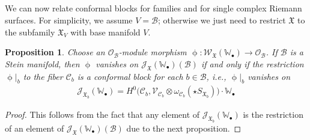 \documentclass[12pt,a4paper,notitlepage]{article}
\theoremstyle{definition}
\theoremstyle{plain}
\newtheorem{pp}[df]{Proposition}
\newcommand{\fk}{\mathfrak}
\newcommand{\mc}{\mathcal}
\newcommand{\scr}{\mathscr}
\newcommand{\SX}{{S_{\fk X}}}
\newcommand{\blt}{\bullet}
\newcommand{\Wbb}{\mathbb W}
\newcommand{\SXb}{{S_{\fk X_b}}}
\numberwithin{equation}{section}
\begin{document}
\subsection{}


We can now relate conformal blocks for families and for single complex Riemann surfaces. For simplicity, we assume $V=\mc B$; otherwise we just need to restrict $\fk X$ to the subfamily $\fk X_V$ with base manifold $V$.

\begin{pp}\label{lb121}
Choose an $\scr O_{\mc B}$-module morphism $\upphi:\scr W_{\fk X}(\Wbb_\blt)\rightarrow\scr O_{\mc B}$. If $\mc B$ is a Stein manifold, then $\upphi$ vanishes on $\scr J_{\fk X}(\Wbb_\blt)(\mc B)$ if and only if the restriction $\upphi|_b$ to the fiber $\mc C_b$ is a conformal block for each $b\in\mc B$, i.e., $\upphi|_b$ vanishes on \index{JX@$\scr J_{\fk X}(\Wbb_\blt),\scr J_{\fk X_b}(\Wbb_\blt)$}
\begin{align}
\scr J_{\fk X_b}(\Wbb_\blt)=H^0\big(\mc C_b,\scr V_{\mc C_b}\otimes\omega_{\mc C_b}(\star\SXb)\big)\cdot \Wbb_\blt
\end{align}
\end{pp}



\begin{proof}

This follows from the fact that any element of $\scr J_{\fk X_b}(\Wbb_\blt)$ is the restriction of an element of $\scr J_{\fk X}(\Wbb_\blt)(\mc B)$ due to the next proposition.
\end{proof}
\end{document}
